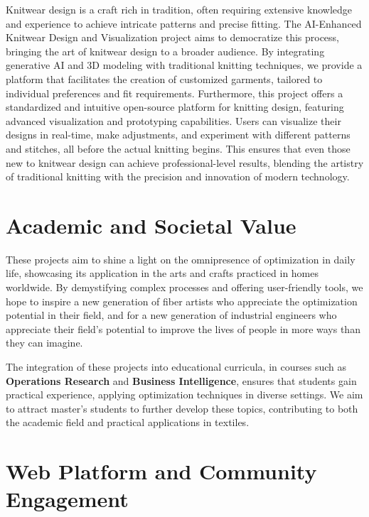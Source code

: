 \documentclass{article}
\begin{document}
    Knitwear design is a craft rich in tradition, often requiring extensive knowledge and experience to achieve
    intricate patterns and precise fitting. The AI-Enhanced Knitwear Design and Visualization project aims to
    democratize this process, bringing the art of knitwear design to a broader audience. By integrating generative AI
    and 3D modeling with traditional knitting techniques, we provide a platform that facilitates the creation of
    customized garments, tailored to individual preferences and fit requirements. Furthermore, this project offers a
    standardized and intuitive open-source platform for knitting design, featuring advanced visualization and
    prototyping capabilities. Users can visualize their designs in real-time, make adjustments, and experiment with
    different patterns and stitches, all before the actual knitting begins. This ensures that even those new to knitwear
    design can achieve professional-level results, blending the artistry of traditional knitting with the precision and
    innovation of modern technology.


    \section{Academic and Societal Value}

    These projects aim to shine a light on the omnipresence of optimization in daily life, showcasing its application in
    the arts and crafts practiced in homes worldwide. By demystifying complex processes and offering user-friendly tools,
    we hope to inspire a new generation of fiber artists who appreciate the optimization potential in their field, and
    for a new generation of industrial engineers who appreciate their field's potential to improve the lives of people
    in more ways than they can imagine.

    The integration of these projects into educational curricula, in courses such as \textbf{Operations Research} and
    \textbf{Business Intelligence}, ensures that students gain practical experience, applying optimization techniques
    in diverse settings.
    We aim to attract master's students to further develop these topics, contributing to both the academic field and
    practical applications in textiles.


    \section{Web Platform and Community Engagement}
\end{document}
